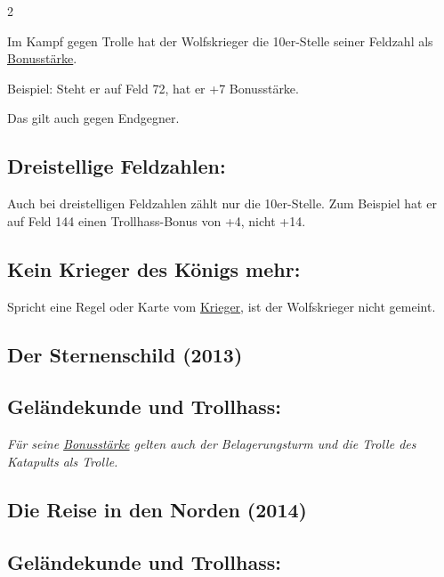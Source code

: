 \documentclass[10pt, a4paper, oneside]{book}
\newcommand{\fan}[1]{\textit{#1}}
\begin{document}
\begin{multicols*}{2}
\begin{nobgcolor}
Im Kampf gegen Trolle hat der Wolfskrieger die 10er-Stelle seiner Feldzahl als \hyperref[Bonusstärke]{Bonusstärke}.

Beispiel: Steht er auf Feld 72, hat er +7 Bonusstärke.

Das gilt auch gegen Endgegner.





\subsection{Dreistellige Feldzahlen:}

Auch bei dreistelligen Feldzahlen zählt nur die 10er-Stelle. Zum Beispiel hat er auf Feld 144 einen Trollhass-Bonus von +4, nicht +14.
\supercite{10525}




\subsection{Kein Krieger des Königs mehr:}

Spricht eine Regel oder Karte vom \hyperref[Krieger]{Krieger}, ist der Wolfskrieger nicht gemeint.

\end{nobgcolor}


\begin{bgcolor}
\section{Der Sternenschild (2013)}

\subsection{Geländekunde und Trollhass:}

\fan{Für seine \hyperref[Bonusstärke]{Bonusstärke} gelten auch der Belagerungsturm und die Trolle des Katapults als Trolle.}

\end{bgcolor}




\begin{bgcolor}
\section{Die Reise in den Norden (2014)}

\subsection{Geländekunde und Trollhass:}


\end{bgcolor}
\end{multicols*}
\end{document}
